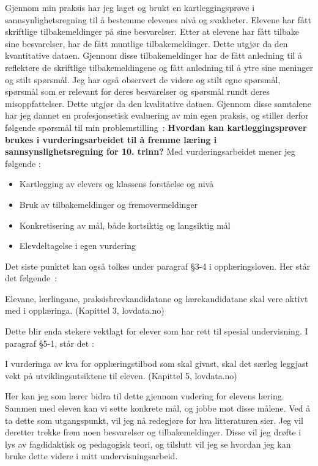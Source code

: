 \documentclass[main.tex]{subfiles}
\begin{document}
Gjennom min praksis har jeg laget og brukt en kartleggingsprøve i sannsynlighetsregning til å bestemme
elevenes nivå og svakheter. Elevene har fått skriftlige tilbakemeldinger på sine besvarelser.
Etter at elevene har fått tilbake sine besvarelser, har de fått muntlige tilbakemeldinger. Dette utgjør da 
den kvantitative dataen. Gjennom disse tilbakemeldinger har de fått anledning til å reflektere
de skriftlige tilbakemeldingene og fått anledning til å ytre sine meninger og stilt spørsmål. Jeg har også
observert de videre og stilt egne spørsmål, spørsmål som er relevant for deres besvarelser og spørsmål
rundt deres misoppfattelser. Dette utgjør da den kvalitative dataen. Gjennom disse samtalene har jeg dannet 
en profesjonsetisk evaluering av min egen praksis, og stiller derfor følgende spørsmål til min 
\mbox{problemstilling :}
\newline
\newline
\textbf{Hvordan kan kartleggingsprøver brukes i vurderingsarbeidet til å fremme læring i 
        sannsynslighetsregning for 10. trinn?}
\newline
\newline
Med vurderingsarbeidet mener jeg følgende :
\begin{itemize}
\item Kartlegging av elevers og klassens forståelse og nivå
\item Bruk av tilbakemeldinger og fremovermeldinger
\item Konkretisering av mål, både kortsiktig og langsiktig mål
\item Elevdeltagelse i egen vurdering
\end{itemize}
Det siste punktet kan også tolkes under paragraf \S 3-4 i opplæringsloven. Her står det \mbox{følgende :}
\begin{displayquote}
Elevane, lærlingane, praksisbrevkandidatane og lærekandidatane skal vere aktivt med i opplæringa.
(Kapittel 3, lovdata.no)
\end{displayquote}
Dette blir enda stekere vektlagt for elever som har rett til spesial undervisning. I paragraf \S 5-1, står det :
\begin{displayquote}
I vurderinga av kva for opplæringstilbod som skal givast, skal det særleg leggjast vekt på utviklingsutsiktene til eleven.
(Kapittel 5, lovdata.no)
\end{displayquote}
Her kan jeg som lærer bidra til dette gjennom vudering for elevens læring. Sammen med eleven kan vi sette konkrete mål,
og jobbe mot disse målene. Ved å ta dette som utgangspunkt, vil jeg nå redegjøre for hva litteraturen sier.
Jeg vil deretter trekke frem noen besvarelser og tilbakemeldinger. Disse vil jeg drøfte i lys av fagdidaktisk og 
pedagogisk teori, og tilslutt vil jeg se hvordan jeg kan bruke dette videre i mitt undervisningsarbeid.
\end{document}
